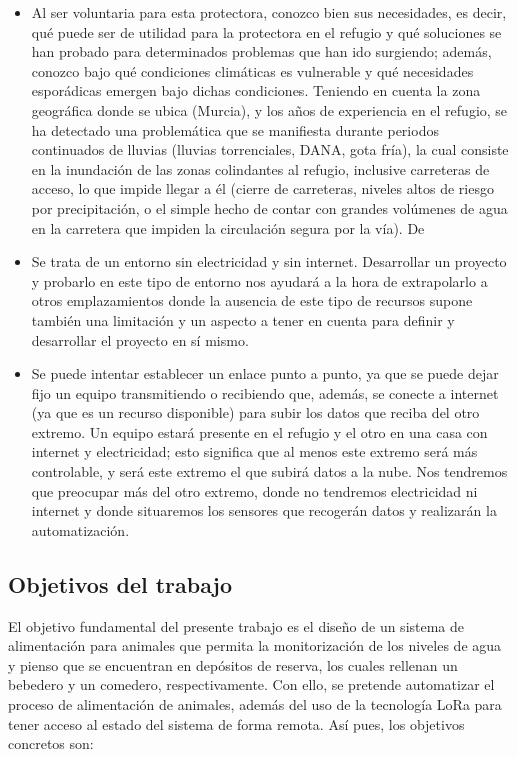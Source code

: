 \documentclass[12pt]{article}
\begin{document}
	\begin{itemize}
		\item Al ser voluntaria para esta protectora, conozco bien sus necesidades, es decir, qué puede ser de utilidad para la protectora en el refugio y qué soluciones se han probado para determinados problemas que han ido surgiendo; además, conozco bajo qué condiciones climáticas es vulnerable y qué necesidades esporádicas emergen bajo dichas condiciones. Teniendo en cuenta la zona geográfica donde se ubica (Murcia), y los años de experiencia en el refugio, se ha detectado una problemática que se manifiesta durante  periodos continuados de lluvias (lluvias torrenciales, DANA, gota fría), la cual consiste en la inundación de las zonas colindantes al refugio, inclusive carreteras de acceso, lo que impide llegar a él (cierre de carreteras, niveles altos de riesgo por precipitación, o el simple hecho de contar con grandes volúmenes de agua en la carretera que impiden la circulación segura por la vía). De
		\item Se trata de un entorno sin electricidad y sin internet. Desarrollar un proyecto y probarlo en este tipo de entorno nos ayudará a la hora de extrapolarlo a otros emplazamientos donde la ausencia de este tipo de recursos supone también una limitación y un aspecto a tener en cuenta para definir y desarrollar el proyecto en sí mismo.
		\item Se puede intentar establecer un enlace punto a punto, ya que se puede dejar fijo un equipo transmitiendo o recibiendo que, además, se conecte a internet (ya que es un recurso disponible) para subir los datos que reciba del otro extremo. Un equipo estará presente en el refugio y el otro en una casa con internet y electricidad; esto significa que al menos este extremo será más controlable, y será este extremo el que subirá datos a la nube. Nos tendremos que preocupar más del otro extremo, donde no tendremos electricidad ni internet y donde situaremos los sensores que recogerán datos y realizarán la automatización.
	\end{itemize}
	
	\subsection[Objetivos del trabajo]{Objetivos del trabajo}
	
	El objetivo fundamental del presente trabajo es el diseño de un sistema de alimentación para animales que permita la monitorización de los niveles de agua y pienso que se encuentran en depósitos de reserva, los cuales rellenan un bebedero y un comedero, respectivamente.  Con ello, se pretende automatizar el proceso de alimentación de animales, además del uso de la tecnología LoRa para tener acceso al estado del sistema de forma remota. Así pues, los objetivos concretos son:
	
\end{document}

